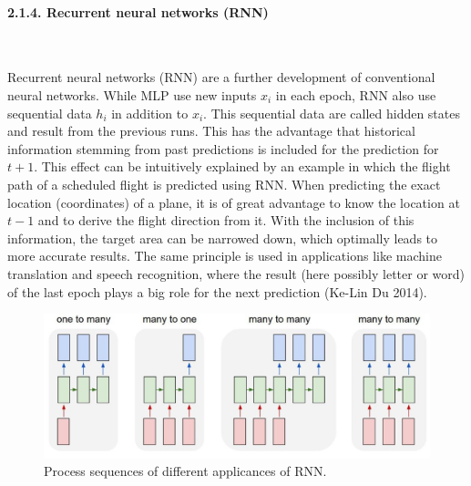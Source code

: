 \documentclass[
]{article}
\begin{document}
\hypertarget{RNN}{%
\paragraph{2.1.4. Recurrent neural networks (RNN)}\label{RNN}}

~

Recurrent neural networks (RNN) are a further development of
conventional neural networks. While MLP use new inputs \(x_i\) in each
epoch, RNN also use sequential data \(h_i\) in addition to \(x_i\). This
sequential data are called hidden states and result from the previous
runs. This has the advantage that historical information stemming from
past predictions is included for the prediction for \(t+1\). This effect
can be intuitively explained by an example in which the flight path of a
scheduled flight is predicted using RNN. When predicting the exact
location (coordinates) of a plane, it is of great advantage to know the
location at \(t-1\) and to derive the flight direction from it. With the
inclusion of this information, the target area can be narrowed down,
which optimally leads to more accurate results. The same principle is
used in applications like machine translation and speech recognition,
where the result (here possibly letter or word) of the last epoch plays
a big role for the next prediction (Ke-Lin Du 2014).

\begin{figure}

{\centering \includegraphics[width=0.8\linewidth]{images/RNN} 

}

\caption{Process sequences of different applicances of RNN.}\label{fig:RNN}
\end{figure}
\end{document}
